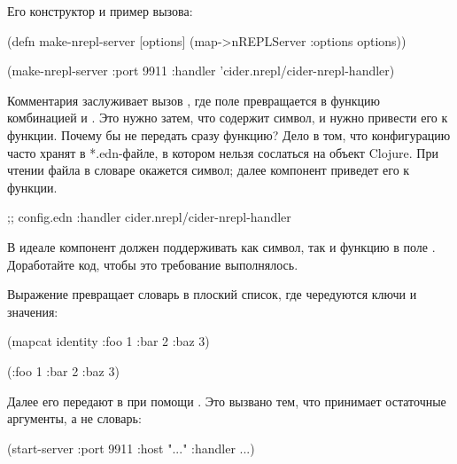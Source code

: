 \fi

Его конструктор и пример вызова:

\begin{english}
  \begin{clojure}
(defn make-nrepl-server [options]
  (map->nREPLServer {:options options}))

(make-nrepl-server
 {:port 9911
  :handler 'cider.nrepl/cider-nrepl-handler})
  \end{clojure}
\end{english}

Комментария заслуживает вызов , где поле  превращается в функцию комбинацией  и  . Это нужно затем, что  содержит символ, и нужно привести его к функции. Почему бы не передать сразу функцию? Дело в том, что конфигурацию часто хранят в *.edn-файле, в котором нельзя сослаться на объект Clojure. При чтении файла в словаре окажется символ; далее компонент приведет его к функции.

\begin{english}
  \begin{clojure}
;; config.edn
{:handler cider.nrepl/cider-nrepl-handler}
  \end{clojure}
\end{english}

В идеале компонент должен поддерживать как символ, так и функцию в поле . Доработайте код, чтобы это требование выполнялось.

Выражение   превращает словарь в плоский список, где чередуются ключи и значения:

\begin{english}
  \begin{clojure}
(mapcat identity {:foo 1 :bar 2 :baz 3})

(:foo 1 :bar 2 :baz 3)
  \end{clojure}
\end{english}

Далее его передают в  при помощи . Это вызвано тем, что  принимает остаточные аргументы, а не словарь:

\begin{english}
  \begin{clojure}
(start-server :port 9911 :host "..." :handler ...)
  \end{clojure}
\end{english}

